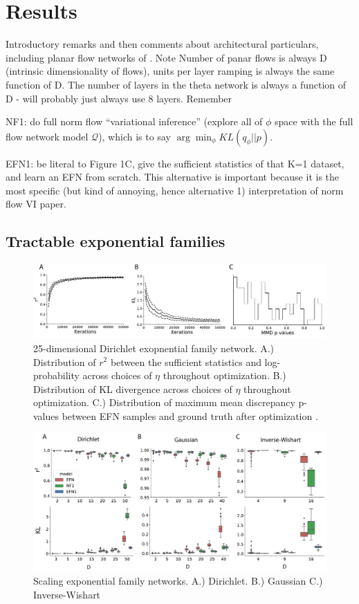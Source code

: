 \documentclass{article}
\begin{document}
  
\section{Results}

Introductory remarks and then comments about architectural particulars, including planar flow networks of \cite{rezende2015variational}. Note Number of panar flows is always D (intrinsic dimensionality of flows), units per layer ramping is always the same function of D.  The number of layers in the theta network is always a function of D - will probably just always use 8 layers.
Remember 

NF1: do full norm flow ``variational inference'' (explore all of $\phi$ space with the full flow network model $\mathcal{Q}$), which is to say $\arg\min_\phi KL(q_\phi || p)$.  

EFN1:  be literal to Figure 1C, give the sufficient statistics of that K=1 dataset, and learn an EFN from scratch.  This alternative is important because it is the most specific (but kind of annoying, hence alternative 1) interpretation of norm flow VI paper.  

\subsection{Tractable exponential families}

 \begin{figure}
  \centering
\includegraphics[scale=0.46]{figs/fig2/fig2.pdf}
  \caption{25-dimensional Dirichlet exopnential family network.  A.) Distribution of $r^2$ between the sufficient statistics and log-probability across choices of $\eta$ throughout optimization.  B.) Distribution of KL divergence across choices of $\eta$ throughout optimization.  C.) Distribution of maximum mean discrepancy p-values between EFN samples and ground truth after optimization \cite{gretton2012kernel}.}
\end{figure}

 \begin{figure}
  \centering
\includegraphics[scale=0.46]{figs/fig3/fig3.pdf}
  \caption{Scaling exponential family networks.  A.) Dirichlet.  B.) Gaussian  C.) Inverse-Wishart}
\end{figure}
\end{document}
